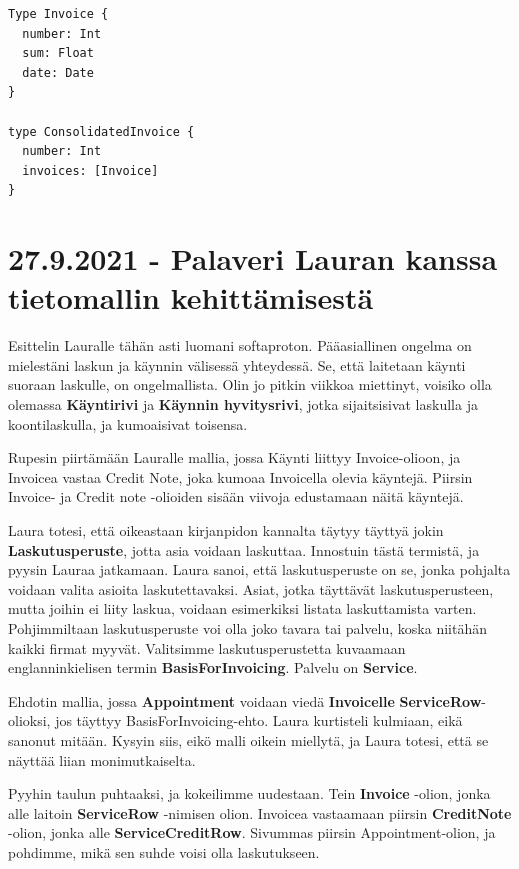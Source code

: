 \begin{verbatim}
Type Invoice {
  number: Int
  sum: Float
  date: Date
}

type ConsolidatedInvoice {
  number: Int
  invoices: [Invoice]
}
\end{verbatim}

\hypertarget{palaveri-lauran-kanssa-tietomallin-kehittuxe4misestuxe4}{%
\section{27.9.2021 - Palaveri Lauran kanssa tietomallin
kehittämisestä}\label{palaveri-lauran-kanssa-tietomallin-kehittuxe4misestuxe4}}

Esittelin Lauralle tähän asti luomani softaproton. Pääasiallinen ongelma
on mielestäni laskun ja käynnin välisessä yhteydessä. Se, että laitetaan
käynti suoraan laskulle, on ongelmallista. Olin jo pitkin viikkoa
miettinyt, voisiko olla olemassa \textbf{Käyntirivi} ja \textbf{Käynnin
hyvitysrivi}, jotka sijaitsisivat laskulla ja koontilaskulla, ja
kumoaisivat toisensa.

Rupesin piirtämään Lauralle mallia, jossa Käynti liittyy Invoice-olioon,
ja Invoicea vastaa Credit Note, joka kumoaa Invoicella olevia käyntejä.
Piirsin Invoice- ja Credit note -olioiden sisään viivoja edustamaan
näitä käyntejä.

Laura totesi, että oikeastaan kirjanpidon kannalta täytyy täyttyä jokin
\textbf{Laskutusperuste}, jotta asia voidaan laskuttaa. Innostuin tästä
termistä, ja pyysin Lauraa jatkamaan. Laura sanoi, että laskutusperuste
on se, jonka pohjalta voidaan valita asioita laskutettavaksi. Asiat,
jotka täyttävät laskutusperusteen, mutta joihin ei liity laskua, voidaan
esimerkiksi listata laskuttamista varten. Pohjimmiltaan laskutusperuste
voi olla joko tavara tai palvelu, koska niitähän kaikki firmat myyvät.
Valitsimme laskutusperustetta kuvaamaan englanninkielisen termin
\textbf{BasisForInvoicing}. Palvelu on \textbf{Service}.

Ehdotin mallia, jossa \textbf{Appointment} voidaan viedä
\textbf{Invoicelle} \textbf{ServiceRow}-olioksi, jos täyttyy
BasisForInvoicing-ehto. Laura kurtisteli kulmiaan, eikä sanonut mitään.
Kysyin siis, eikö malli oikein miellytä, ja Laura totesi, että se
näyttää liian monimutkaiselta.

Pyyhin taulun puhtaaksi, ja kokeilimme uudestaan. Tein \textbf{Invoice}
-olion, jonka alle laitoin \textbf{ServiceRow} -nimisen olion. Invoicea
vastaamaan piirsin \textbf{CreditNote} -olion, jonka alle
\textbf{ServiceCreditRow}. Sivummas piirsin Appointment-olion, ja
pohdimme, mikä sen suhde voisi olla laskutukseen.


